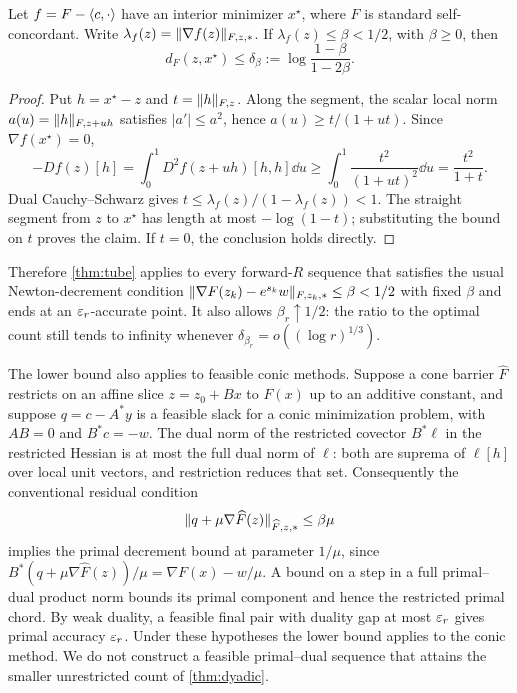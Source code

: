 \begin{lemma}
\label{lem:decrement-tube}
Let $f=F-\langle c,\cdot\rangle$ have an interior minimizer $x^\star$, where $F$
is standard self-concordant. Write
$\lambda_f(z)=\lVert \nabla f(z)\rVert_{F,z,*}$. If
$\lambda_f(z)\leq\beta<1/2$, with $\beta\geq0$, then
\begin{equation}
 d_F(z,x^\star)\leq
 \delta_\beta:=\log\frac{1-\beta}{1-2\beta}.
 \label{eq:decrement-tube}
\end{equation}
\end{lemma}
\begin{proof}
Put $h=x^\star-z$ and $t=\lVert h\rVert_{F,z}$. Along the segment, the scalar
local norm $a(u)=\lVert h\rVert_{F,z+uh}$ satisfies $|a'|\leq a^2$,
hence $a(u)\geq t/(1+ut)$. Since $\nabla f(x^\star)=0$,
\[
 -Df(z)[h]=\int_0^1D^2f(z+uh)[h,h]\dd u
 \geq\int_0^1\frac{t^2}{(1+ut)^2}\dd u=\frac{t^2}{1+t}.
\]
Dual Cauchy--Schwarz gives $t\leq\lambda_f(z)/(1-\lambda_f(z))<1$.
The straight segment from $z$ to $x^\star$ has length at most
$-\log(1-t)$; substituting the bound on $t$ proves
the claim. If $t=0$, the conclusion holds directly.
\end{proof}
Therefore \cref{thm:tube} applies to every forward-$R$ sequence that
satisfies the usual Newton-decrement condition
$\lVert \nabla F(z_k)-e^{s_k}w\rVert_{F,z_k,*}\leq\beta<1/2$ with fixed
$\beta$ and ends at an $\varepsilon_r$-accurate point. It also allows
$\beta_r\uparrow1/2$: the ratio to the optimal count still tends to
infinity whenever $\delta_{\beta_r}=o((\log r)^{1/3})$.

The lower bound also applies to feasible conic methods. Suppose a
cone barrier $\widehat F$ restricts on an affine slice $z=z_0+Bx$ to
$F(x)$ up to an additive constant, and
suppose $q=c-A^*y$ is a feasible slack for a conic minimization problem,
with $AB=0$ and $B^*c=-w$. The dual norm of the restricted
covector $B^*\ell$ in the restricted Hessian is at most the full dual
norm of $\ell$: both are suprema of $\ell[h]$ over local unit vectors,
and restriction reduces that set. Consequently the conventional residual
condition
\[
 \lVert q+\mu\nabla\widehat F(z)\rVert_{\widehat F,z,*}\leq\beta\mu
\]
implies the primal decrement bound at parameter $1/\mu$, since
$B^*(q+\mu\nabla\widehat F(z))/\mu=\nabla F(x)-w/\mu$.
A bound on a step in a full primal--dual product norm bounds its
primal component and hence the restricted primal chord. By weak
duality, a feasible final pair with duality gap at most $\varepsilon_r$ gives
primal accuracy $\varepsilon_r$. Under these hypotheses the lower bound
applies to the conic method. We do not construct a feasible
primal--dual sequence that attains the smaller unrestricted count of
\cref{thm:dyadic}.

